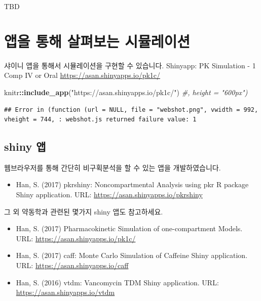 \documentclass[12pt,]{krantz}
\newenvironment{Shaded}{\begin{snugshade}}{\end{snugshade}}
\newcommand{\KeywordTok}[1]{\textcolor[rgb]{0.13,0.29,0.53}{\textbf{#1}}}
\newcommand{\StringTok}[1]{\textcolor[rgb]{0.31,0.60,0.02}{#1}}
\newcommand{\CommentTok}[1]{\textcolor[rgb]{0.56,0.35,0.01}{\textit{#1}}}
\newcommand{\OperatorTok}[1]{\textcolor[rgb]{0.81,0.36,0.00}{\textbf{#1}}}
\newcommand{\NormalTok}[1]{#1}
\providecommand{\tightlist}{%
  \setlength{\itemsep}{0pt}\setlength{\parskip}{0pt}}
\theoremstyle{definition}
\theoremstyle{definition}
\theoremstyle{definition}
\theoremstyle{remark}
\begin{document}
TBD

\section{앱을 통해 살펴보는 시뮬레이션}\label{---}

샤이니 앱을 통해서 시뮬레이션을 구현할 수 있습니다. Shinyapp: PK
Simulation - 1 Comp IV or Oral \url{https://asan.shinyapps.io/pk1c/}

\begin{Shaded}
\begin{Highlighting}[]
\NormalTok{knitr}\OperatorTok{::}\KeywordTok{include_app}\NormalTok{(}\StringTok{"https://asan.shinyapps.io/pk1c/"}\NormalTok{) }\CommentTok{#, height = "600px")}
\end{Highlighting}
\end{Shaded}

\begin{verbatim}
## Error in (function (url = NULL, file = "webshot.png", vwidth = 992, vheight = 744, : webshot.js returned failure value: 1
\end{verbatim}

\subsection{shiny 앱}\label{shiny-}

웹브라우저를 통해 간단히 비구획분석을 할 수 있는 앱을 개발하였습니다.

\begin{itemize}
\tightlist
\item
  Han, S. (2017) pkrshiny: Noncompartmental Analysis using pkr R package
  Shiny application. URL: \url{https://asan.shinyapps.io/pkrshiny}
\end{itemize}

그 외 약동학과 관련된 몇가지 shiny 앱도 참고하세요.

\begin{itemize}
\tightlist
\item
  Han, S. (2017) Pharmacokinetic Simulation of one-compartment Models.
  URL: \url{https://asan.shinyapps.io/pk1c/}
\item
  Han, S. (2017) caff: Monte Carlo Simulation of Caffeine Shiny
  application. URL: \url{https://asan.shinyapps.io/caff}
\item
  Han, S. (2016) vtdm: Vancomycin TDM Shiny application. URL:
  \url{https://asan.shinyapps.io/vtdm}
\end{itemize}
\end{document}
